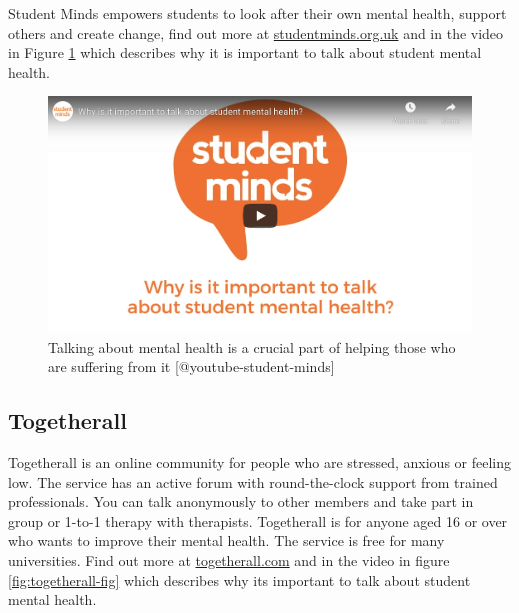 \documentclass[
]{book}
\begin{document}
Student Minds empowers students to look after their own mental health, support others and create change, find out more at \href{https://www.studentminds.org.uk}{studentminds.org.uk} and in the video in Figure \ref{fig:studentminds-fig} which describes why it is important to talk about student mental health.

\begin{figure}

{\centering \includegraphics[width=0.99\linewidth]{images/youtube-student-minds} 

}

\caption{Talking about mental health is a crucial part of helping those who are suffering from it [@youtube-student-minds]}\label{fig:studentminds-fig}
\end{figure}

\hypertarget{togetherall}{%
\subsection{Togetherall}\label{togetherall}}

Togetherall is an online community for people who are stressed, anxious or feeling low. The service has an active forum with round-the-clock support from trained professionals. You can talk anonymously to other members and take part in group or 1-to-1 therapy with therapists. Togetherall is for anyone aged 16 or over who wants to improve their mental health. The service is free for many universities. Find out more at \href{https://togetherall.com/}{togetherall.com} and in the video in figure \ref{fig:togetherall-fig} which describes why its important to talk about student mental health.
\end{document}
